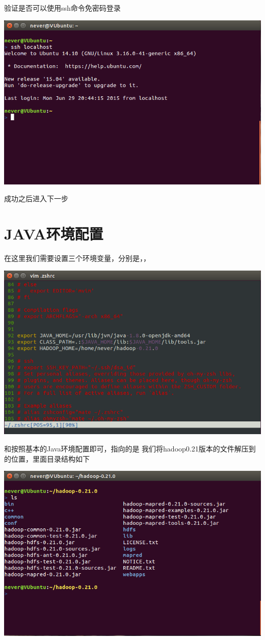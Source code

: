验证是否可以使用ssh命令免密码登录

\includegraphics[width=\textwidth]{image/env/cr4.png}

成功之后进入下一步

\section{JAVA环境配置}

在这里我们需要设置三个环境变量，分别是{\JH}，{\CPATH}，{\HHOME}

\includegraphics[width=\textwidth]{image/env/cr5.png}

{\JH}和{\CPATH}按照基本的Java环境配置即可，{\HHOME}指向的是
我们将hadoop0.21版本的文件解压到的位置，里面目录结构如下

\includegraphics[width=\textwidth]{image/env/cr6.png}

